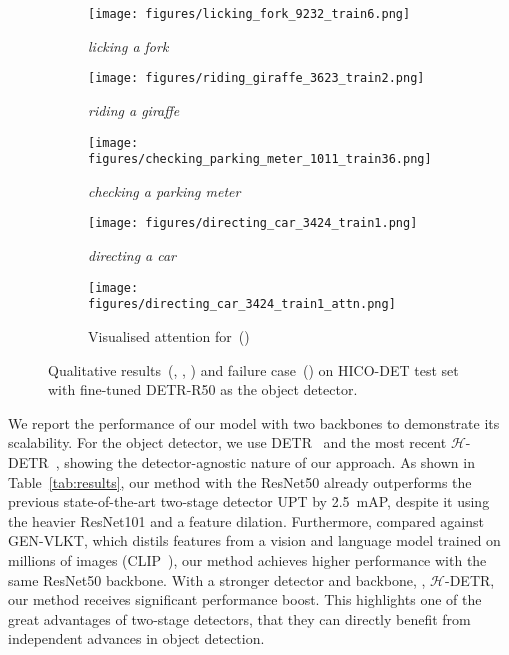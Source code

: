 \documentclass[10pt,twocolumn,letterpaper]{article}
\begin{document}
\begin{figure*}[t]\captionsetup[subfigure]{font=footnotesize}
   \begin{subfigure}[t]{0.195\linewidth}
     \centering
     \texttt{[image: figures/licking\_fork\_9232\_train6.png]}
     \caption{\textit{licking a fork}}
     \label{fig:qual-licking-fork}
   \end{subfigure}
   \hfill
   \begin{subfigure}[t]{0.195\linewidth}
     \centering
     \texttt{[image: figures/riding\_giraffe\_3623\_train2.png]}
     \caption{\textit{riding a giraffe}}
     \label{fig:qual-riding-giraffe}
   \end{subfigure}
   \hfill
   \begin{subfigure}[t]{0.195\linewidth}
     \centering
     \texttt{[image: figures/checking\_parking\_meter\_1011\_train36.png]}
     \caption{\textit{checking a parking meter}}
     \label{fig:qual-checking-meter}
   \end{subfigure}
   \hfill
   \begin{subfigure}[t]{0.195\linewidth}
      \centering
      \texttt{[image: figures/directing\_car\_3424\_train1.png]}
      \caption{\textit{directing a car}}
      \label{fig:fail-directing-car}
   \end{subfigure}
   \hfill
   \begin{subfigure}[t]{0.195\linewidth}
      \centering
      \texttt{[image: figures/directing\_car\_3424\_train1\_attn.png]}
      \caption{Visualised attention for~()}
      \label{fig:fail-directing-car-attn}
   \end{subfigure}
   \vspace{5px}
   \caption{Qualitative results~(, , ) and failure case~() on HICO-DET test set with fine-tuned DETR-R50 as the object detector.}
   \label{fig:qual}
   \vspace*{-3px}
\end{figure*}

We report the performance of our model with two backbones to demonstrate its scalability. For the object detector, we use DETR~\cite{detr} and the most recent $\mathcal{H}$-DETR~\cite{hdetr}, showing the detector-agnostic nature of our approach. As shown in Table~\ref{tab:results}, our method with the ResNet50 already outperforms the previous state-of-the-art two-stage detector UPT by 2.5~mAP, despite it using the heavier ResNet101 and a feature dilation. Furthermore, compared against GEN-VLKT, which distils features from a vision and language model trained on millions of images (CLIP~\cite{clip}), our method achieves higher performance with the same ResNet50 backbone. With a stronger detector and backbone, \ie, $\mathcal{H}$-DETR, our method receives significant performance boost. This highlights one of the great advantages of two-stage detectors, that they can directly benefit from independent advances in object detection.
\end{document}
